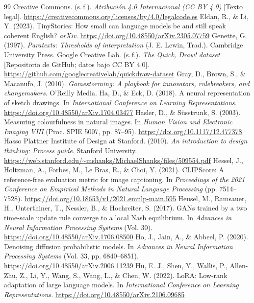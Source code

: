 \documentclass[10pt,a4paper,twocolumn]{article}
\begin{document}
{\begin{thebibliography}{99}
 Creative Commons. (s.\,f.). \emph{Atribución 4.0 Internacional (CC BY 4.0)} [Texto legal]. \url{https://creativecommons.org/licenses/by/4.0/legalcode.es}
 Eldan, R., \& Li, Y. (2023). TinyStories: How small can language models be and still speak coherent English? \emph{arXiv}. \url{https://doi.org/10.48550/arXiv.2305.07759}
 Genette, G. (1997). \emph{Paratexts: Thresholds of interpretation} (J. E. Lewin, Trad.). Cambridge University Press.
 Google Creative Lab. (s.\,f.). \emph{The Quick, Draw! dataset} [Repositorio de GitHub; datos bajo CC BY 4.0]. \url{https://github.com/googlecreativelab/quickdraw-dataset}
 Gray, D., Brown, S., \& Macanufo, J. (2010). \emph{Gamestorming: A playbook for innovators, rulebreakers, and changemakers}. O'Reilly Media.
 Ha, D., \& Eck, D. (2018). A neural representation of sketch drawings. In \emph{International Conference on Learning Representations}. \url{https://doi.org/10.48550/arXiv.1704.03477}
 Hasler, D., \& Süsstrunk, S. (2003). Measuring colourfulness in natural images. In \emph{Human Vision and Electronic Imaging VIII} (Proc. SPIE 5007, pp. 87--95). \url{https://doi.org/10.1117/12.477378}
 Hasso Plattner Institute of Design at Stanford. (2010). \emph{An introduction to design thinking: Process guide}. Stanford University. \url{https://web.stanford.edu/~mshanks/MichaelShanks/files/509554.pdf}
 Hessel, J., Holtzman, A., Forbes, M., Le Bras, R., \& Choi, Y. (2021). CLIPScore: A reference-free evaluation metric for image captioning. In \emph{Proceedings of the 2021 Conference on Empirical Methods in Natural Language Processing} (pp. 7514--7528). \url{https://doi.org/10.18653/v1/2021.emnlp-main.595}
 Heusel, M., Ramsauer, H., Unterthiner, T., Nessler, B., \& Hochreiter, S. (2017). GANs trained by a two time-scale update rule converge to a local Nash equilibrium. In \emph{Advances in Neural Information Processing Systems} (Vol. 30). \url{https://doi.org/10.48550/arXiv.1706.08500}
 Ho, J., Jain, A., \& Abbeel, P. (2020). Denoising diffusion probabilistic models. In \emph{Advances in Neural Information Processing Systems} (Vol. 33, pp. 6840--6851). \url{https://doi.org/10.48550/arXiv.2006.11239}
 Hu, E. J., Shen, Y., Wallis, P., Allen-Zhu, Z., Li, Y., Wang, S., Wang, L., \& Chen, W. (2022). LoRA: Low-rank adaptation of large language models. In \emph{International Conference on Learning Representations}. \url{https://doi.org/10.48550/arXiv.2106.09685}

\end{thebibliography}}
\end{document}
